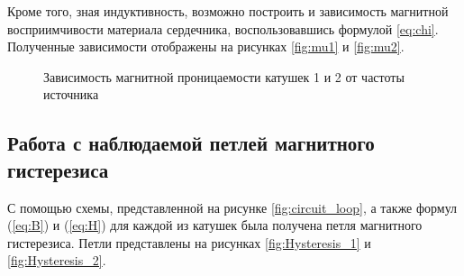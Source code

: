 \documentclass[a4paper, 12pt]{article}
\begin{document}
Кроме того, зная индуктивность, возможно построить и зависимость магнитной восприимчивости материала сердечника, воспользовавшись формулой \ref{eq:chi}. Полученные зависимости отображены на рисунках \ref{fig:mu1} и \ref{fig:mu2}.

\begin{figure}[H]
	\centering
	\caption{Зависимость магнитной проницаемости катушек 1  и 2  от частоты источника}
\end{figure}

\subsection{Работа с наблюдаемой петлей магнитного гистерезиса}

С помощью схемы, представленной на рисунке \ref{fig:circuit_loop}, а также формул (\ref{eq:B}) и (\ref{eq:H}) для каждой из катушек была получена петля магнитного гистерезиса. Петли представлены на рисунках \ref{fig:Hysteresis_1} и \ref{fig:Hysteresis_2}.
\end{document}
